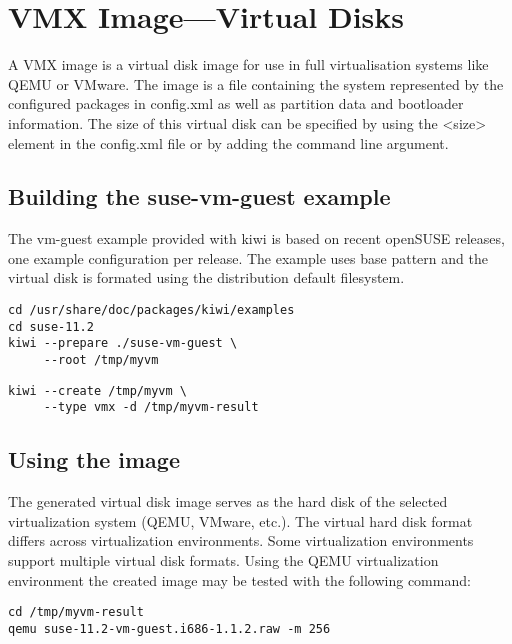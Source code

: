 \chapter{VMX Image---Virtual Disks}
\label{chapter:vmx}
\minitoc

A VMX image is a virtual disk image for use in full virtualisation
systems like QEMU or VMware. The image is a file containing the
system represented by the configured packages in config.xml as well
as partition data and bootloader information. The size of
this virtual disk can be specified by using the <size> element
in the config.xml file or by adding the  command
line argument.

\section{Building the suse-vm-guest example}

The vm-guest example provided with kiwi is based on recent openSUSE releases,
one example configuration per release. The example uses base pattern and the
virtual disk is formated using the distribution default filesystem.

\begin{Command}{12cm}
\begin{verbatim}
cd /usr/share/doc/packages/kiwi/examples
cd suse-11.2
kiwi --prepare ./suse-vm-guest \
     --root /tmp/myvm
\end{verbatim}
\end{Command}

\begin{Command}{12cm}
\begin{verbatim}
kiwi --create /tmp/myvm \
     --type vmx -d /tmp/myvm-result
\end{verbatim}
\end{Command}

\section{Using the image}

The generated virtual disk image serves as the hard disk of the selected
virtualization system (QEMU, VMware, etc.). The virtual hard disk format 
differs across virtualization environments. Some virtualization environments
support multiple virtual disk formats. Using the QEMU virtualization 
environment the created image may be tested with the following command:

\begin{Command}{12cm}
\begin{verbatim}
cd /tmp/myvm-result
qemu suse-11.2-vm-guest.i686-1.1.2.raw -m 256
\end{verbatim}
\end{Command}

